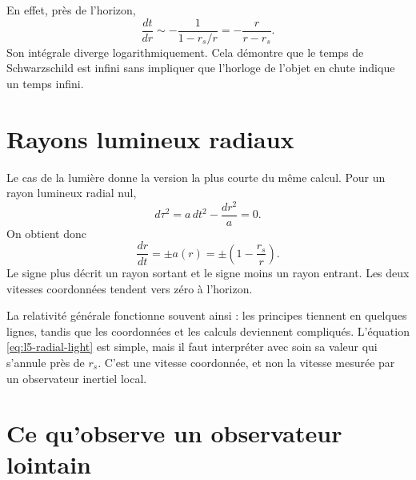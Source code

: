 En effet, près de l’horizon,
\begin{equation}
\frac{dt}{dr}
\sim-\frac{1}{1-r_s/r}
=-\frac{r}{r-r_s}.
\end{equation}
Son intégrale diverge logarithmiquement. Cela démontre que le temps de Schwarzschild est infini sans impliquer que l’horloge de l’objet en chute indique un temps infini.

\section{Rayons lumineux radiaux}

Le cas de la lumière donne la version la plus courte du même calcul. Pour un rayon lumineux radial nul,
\begin{equation}
d\tau^2
=a\,dt^2-\frac{dr^2}{a}=0.
\end{equation}
On obtient donc
\begin{equation}
\boxed{
\frac{dr}{dt}
=\pm a(r)
=\pm\left(1-\frac{r_s}{r}\right).
}
\label{eq:l5-radial-light}
\end{equation}
Le signe plus décrit un rayon sortant et le signe moins un rayon entrant. Les deux vitesses coordonnées tendent vers zéro à l’horizon.

\begin{classroomqa}
\end{classroomqa}

La relativité générale fonctionne souvent ainsi : les principes tiennent en quelques lignes, tandis que les coordonnées et les calculs deviennent compliqués. L’équation \eqref{eq:l5-radial-light} est simple, mais il faut interpréter avec soin sa valeur qui s’annule près de \(r_s\). C’est une vitesse coordonnée, et non la vitesse mesurée par un observateur inertiel local.

\section{Ce qu’observe un observateur lointain}

\begin{classroomqa}
\end{classroomqa}


